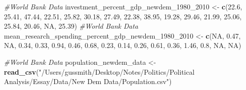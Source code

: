 \documentclass[11pt, oneside]{article}   	%
\newenvironment{Shaded}{\begin{snugshade}}{\end{snugshade}}
\newcommand{\CommentTok}[1]{\textcolor[rgb]{0.56,0.35,0.01}{\textit{#1}}}
\newcommand{\DecValTok}[1]{\textcolor[rgb]{0.00,0.00,0.81}{#1}}
\newcommand{\FloatTok}[1]{\textcolor[rgb]{0.00,0.00,0.81}{#1}}
\newcommand{\KeywordTok}[1]{\textcolor[rgb]{0.13,0.29,0.53}{\textbf{#1}}}
\newcommand{\NormalTok}[1]{#1}
\newcommand{\OtherTok}[1]{\textcolor[rgb]{0.56,0.35,0.01}{#1}}
\newcommand{\StringTok}[1]{\textcolor[rgb]{0.31,0.60,0.02}{#1}}
\begin{document}
\begin{Shaded}
\begin{Highlighting}[]
\CommentTok{#World Bank Data}
\NormalTok{investment_percent_gdp_newdem_}\DecValTok{1980}\NormalTok{_}\DecValTok{2010}\NormalTok{ <-}\StringTok{ }\KeywordTok{c}\NormalTok{(}\FloatTok{22.6}\NormalTok{, }\FloatTok{25.41}\NormalTok{, }\FloatTok{47.44}\NormalTok{, }\FloatTok{22.51}\NormalTok{, }\FloatTok{25.82}\NormalTok{, }\FloatTok{30.18}\NormalTok{,}
                                             \FloatTok{27.49}\NormalTok{, }\FloatTok{22.38}\NormalTok{, }\FloatTok{38.95}\NormalTok{, }\FloatTok{19.28}\NormalTok{, }\FloatTok{29.46}\NormalTok{, }\FloatTok{21.99}\NormalTok{,}
                                             \FloatTok{25.06}\NormalTok{, }\FloatTok{25.84}\NormalTok{, }\FloatTok{20.46}\NormalTok{, }\OtherTok{NA}\NormalTok{, }\FloatTok{25.39}\NormalTok{)}
\CommentTok{#World Bank Data}
\NormalTok{mean_research_spending_percent_gdp_newdem_}\DecValTok{1980}\NormalTok{_}\DecValTok{2010}\NormalTok{ <-}\StringTok{ }\KeywordTok{c}\NormalTok{(}\OtherTok{NA}\NormalTok{, }\FloatTok{0.47}\NormalTok{, }\OtherTok{NA}\NormalTok{, }\FloatTok{0.34}\NormalTok{, }\FloatTok{0.33}\NormalTok{, }
                                                         \FloatTok{0.94}\NormalTok{, }\FloatTok{0.46}\NormalTok{, }\FloatTok{0.68}\NormalTok{, }\FloatTok{0.23}\NormalTok{,}
                                                         \FloatTok{0.14}\NormalTok{, }\FloatTok{0.26}\NormalTok{, }\FloatTok{0.61}\NormalTok{, }\FloatTok{0.36}\NormalTok{, }\FloatTok{1.46}\NormalTok{,}
                                                         \FloatTok{0.8}\NormalTok{, }\OtherTok{NA}\NormalTok{, }\OtherTok{NA}\NormalTok{)}

\CommentTok{#World Bank Data}
\NormalTok{population_newdem_data <-}\StringTok{ }\KeywordTok{read_csv}\NormalTok{(}\StringTok{"/Users/gussmith/Desktop/Notes/Politics/Political Analysis/Essay/Data/New Dem Data/Population.csv"}\NormalTok{)}


\end{Highlighting}
\end{Shaded}
\end{document}
